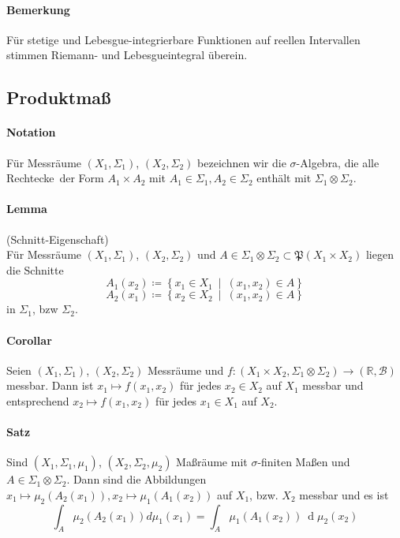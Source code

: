 \documentclass[12pt,a4paper,fleqn]{article}
\def\set#1{{\left\{ #1 \right\}}}
\def\Mid{\ \middle|\ }
\def\d{{\operatorname{d}}}
\begin{document}
\paragraph{Bemerkung} Für stetige und Lebesgue-integrierbare Funktionen auf reellen Intervallen stimmen Riemann- und Lebesgueintegral überein.

\subsection{Produktmaß}

\paragraph{Notation} Für Messräume $(X_1, \Sigma_1)$, $(X_2, \Sigma_2)$ bezeichnen wir die $\sigma$-Algebra, die alle \glqq Rechtecke\grqq\ der Form $A_1 \times A_2$ mit $A_1 \in \Sigma_1, A_2 \in \Sigma_2$ enthält mit $\Sigma_1 \otimes \Sigma_2$.

\paragraph{Lemma} (Schnitt-Eigenschaft)\\
Für Messräume $(X_1, \Sigma_1)$, $(X_2, \Sigma_2)$ und $A \in \Sigma_1 \otimes \Sigma_2 \subset \mathfrak{P}(X_1 \times X_2)$ liegen die Schnitte
\begin{displaymath}
A_1(x_2) \coloneqq \set{x_1 \in X_1 \Mid (x_1, x_2) \in A} 
\end{displaymath}
\begin{displaymath}
A_2(x_1) \coloneqq \set{x_2 \in X_2 \Mid (x_1, x_2) \in A} 
\end{displaymath}
in $\Sigma_1$, bzw $\Sigma_2$.

\paragraph{Corollar} Seien $(X_1, \Sigma_1)$, $(X_2, \Sigma_2)$ Messräume und ${f\colon (X_1 \times X_2, \Sigma_1 \otimes \Sigma_2) \rightarrow (\mathbb{R}, \mathcal{B})}$ messbar. Dann ist $x_1 \mapsto f(x_1, x_2)$ für jedes $x_2 \in X_2$ auf $X_1$ messbar und entsprechend $x_2 \mapsto f(x_1, x_2)$ für jedes $x_1 \in X_1$ auf $X_2$.

\paragraph{Satz} Sind $(X_1, \Sigma_1, \mu_1)$, $(X_2, \Sigma_2, \mu_2)$ Maßräume mit $\sigma$-finiten Maßen und ${A \in \Sigma_1 \otimes \Sigma_2}$. Dann sind die Abbildungen $x_1 \mapsto \mu_2(A_2(x_1)), x_2 \mapsto \mu_1(A_1(x_2))$ auf $X_1$, bzw. $X_2$ messbar und es ist
\begin{displaymath}
\int_A \mu_2(A_2(x_1)) d\mu_1(x_1) = \int_A \mu_1(A_1(x_2))\ \d\mu_2(x_2)
\end{displaymath}
\end{document}
